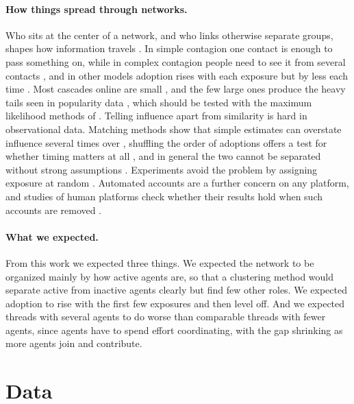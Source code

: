 \documentclass[11pt]{article}
\begin{document}
\paragraph{How things spread through networks.}
Who sits at the center of a network, and who links otherwise separate groups, shapes how information travels \citep{freeman1977centrality, borgatti2000coreperiphery, guimera2005functional}. In simple contagion one contact is enough to pass something on, while in complex contagion people need to see it from several contacts \citep{centola2007complex}, and in other models adoption rises with each exposure but by less each time \citep{dodds2004universal}. Most cascades online are small \citep{goel2012structure}, and the few large ones produce the heavy tails seen in popularity data \citep{weng2012competition}, which should be tested with the maximum likelihood methods of \citet{clauset2009power}. Telling influence apart from similarity is hard in observational data. Matching methods show that simple estimates can overstate influence several times over \citep{aral2009distinguishing}, shuffling the order of adoptions offers a test for whether timing matters at all \citep{anagnostopoulos2008influence}, and in general the two cannot be separated without strong assumptions \citep{shalizi2011homophily}. Experiments avoid the problem by assigning exposure at random \citep{centola2010spread, bakshy2012role}. Automated accounts are a further concern on any platform, and studies of human platforms check whether their results hold when such accounts are removed \citep{vosoughi2018spread}.

\paragraph{What we expected.}
From this work we expected three things. We expected the network to be organized mainly by how active agents are, so that a clustering method would separate active from inactive agents clearly but find few other roles. We expected adoption to rise with the first few exposures and then level off. And we expected threads with several agents to do worse than comparable threads with fewer agents, since agents have to spend effort coordinating, with the gap shrinking as more agents join and contribute.

\section{Data}
\label{sec:data}
\end{document}
